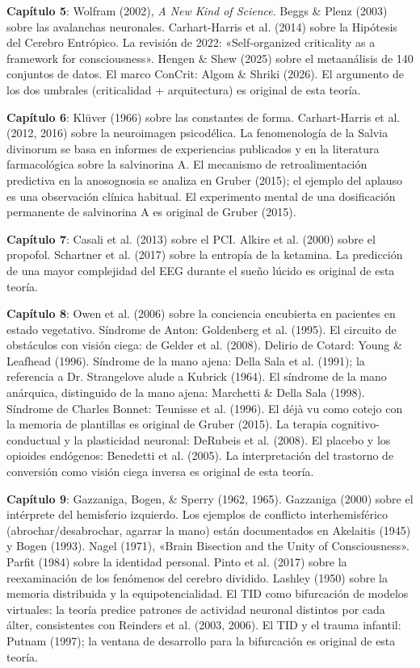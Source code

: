 \documentclass[11pt, twoside, openright]{book}
\begin{document}
\textbf{Capítulo 5}: Wolfram (2002), \textit{A New Kind of Science}. Beggs \& Plenz (2003) sobre las avalanchas neuronales. Carhart-Harris et al. (2014) sobre la Hipótesis del Cerebro Entrópico. La revisión de 2022: «Self-organized criticality as a framework for consciousness». Hengen \& Shew (2025) sobre el metaanálisis de 140 conjuntos de datos. El marco ConCrit: Algom \& Shriki (2026). El argumento de los dos umbrales (criticalidad + arquitectura) es original de esta teoría.

\textbf{Capítulo 6}: Klüver (1966) sobre las constantes de forma. Carhart-Harris et al. (2012, 2016) sobre la neuroimagen psicodélica. La fenomenología de la Salvia divinorum se basa en informes de experiencias publicados y en la literatura farmacológica sobre la salvinorina A. El mecanismo de retroalimentación predictiva en la anosognosia se analiza en Gruber (2015); el ejemplo del aplauso es una observación clínica habitual. El experimento mental de una dosificación permanente de salvinorina A es original de Gruber (2015).

\textbf{Capítulo 7}: Casali et al. (2013) sobre el PCI. Alkire et al. (2000) sobre el propofol. Schartner et al. (2017) sobre la entropía de la ketamina. La predicción de una mayor complejidad del EEG durante el sueño lúcido es original de esta teoría.

\textbf{Capítulo 8}: Owen et al. (2006) sobre la conciencia encubierta en pacientes en estado vegetativo. Síndrome de Anton: Goldenberg et al. (1995). El circuito de obstáculos con visión ciega: de Gelder et al. (2008). Delirio de Cotard: Young \& Leafhead (1996). Síndrome de la mano ajena: Della Sala et al. (1991); la referencia a Dr. Strangelove alude a Kubrick (1964). El síndrome de la mano anárquica, distinguido de la mano ajena: Marchetti \& Della Sala (1998). Síndrome de Charles Bonnet: Teunisse et al. (1996). El déjà vu como cotejo con la memoria de plantillas es original de Gruber (2015). La terapia cognitivo-conductual y la plasticidad neuronal: DeRubeis et al. (2008). El placebo y los opioides endógenos: Benedetti et al. (2005). La interpretación del trastorno de conversión como visión ciega inversa es original de esta teoría.

\textbf{Capítulo 9}: Gazzaniga, Bogen, \& Sperry (1962, 1965). Gazzaniga (2000) sobre el intérprete del hemisferio izquierdo. Los ejemplos de conflicto interhemisférico (abrochar/\allowbreak{}desabrochar, agarrar la mano) están documentados en Akelaitis (1945) y Bogen (1993). Nagel (1971), «Brain Bisection and the Unity of Consciousness». Parfit (1984) sobre la identidad personal. Pinto et al. (2017) sobre la reexaminación de los fenómenos del cerebro dividido. Lashley (1950) sobre la memoria distribuida y la equipotencialidad. El TID como bifurcación de modelos virtuales: la teoría predice patrones de actividad neuronal distintos por cada álter, consistentes con Reinders et al. (2003, 2006). El TID y el trauma infantil: Putnam (1997); la ventana de desarrollo para la bifurcación es original de esta teoría.
\end{document}

